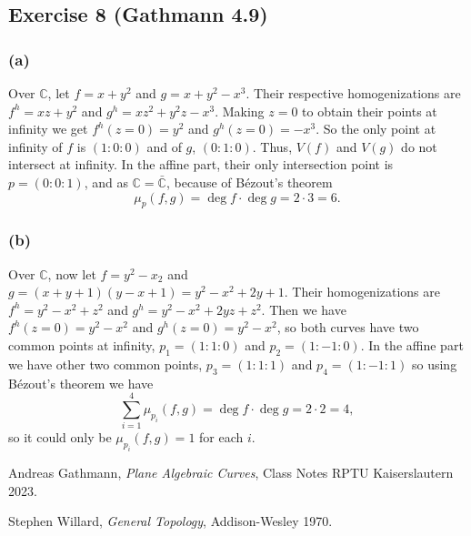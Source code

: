 \documentclass[11pt,a4paper]{article}
\begin{document}
\subsection*{Exercise 8 (Gathmann 4.9)}

\subsubsection*{(a)}
Over $ \mathbb C $, let $ f = x + y^2 $ and $ g = x + y^2 - x^3 $. Their respective homogenizations are $ f^{h} = xz +y^2 $ and $ g^{h} = xz^2 + y^2z - x^3 $. Making $ z = 0 $ to obtain their points at infinity we get $ f^{h}(z=0) = y^2 $ and $ g^{h}(z=0) = -x^3 $. So the only point at infinity of $ f $ is $ (1:0:0) $ and of $ g $, $ (0:1:0) $. Thus, $ V(f) $ and $ V(g) $ do not intersect at infinity. In the affine part, their only intersection point is $ p = (0:0:1) $, and as $ \mathbb C = \bar{\mathbb C}$, because of Bézout's theorem
$$
  \mu_p(f, g) = \deg f \cdot \deg g = 2 \cdot 3 = 6.
$$

\subsubsection*{(b)}
Over $ \mathbb C $, now let $ f = y^2 - x_2 $ and $ g = (x + y + 1) (y - x + 1) = y^2 - x^2 + 2y + 1 $. Their homogenizations are $ f^h = y^2 - x^2 + z^2 $ and $ g^h = y^2 - x^2 + 2yz + z^2 $. Then we have $ f^h(z=0) = y^2 - x^2 $ and $ g^h(z=0) = y^2 - x^2 $, so both curves have two common points at infinity, $ p_1 = (1:1:0) $ and $ p_2 = (1:-1:0) $. In the affine part we have other two common points, $ p_3 = (1:1:1) $ and $ p_4 = (1:-1:1) $ so using Bézout's theorem we have
$$
  \sum_{i=1}^{4} \mu_{p_i}(f, g) = \deg f \cdot \deg g = 2 \cdot 2 = 4,
$$
so it could only be $ \mu_{p_i}(f, g) = 1 $ for each $ i $.

\begin{thebibliography}{9}

  Andreas Gathmann,
  \textit{Plane Algebraic Curves},
  Class Notes RPTU Kaiserslautern 2023.

  Stephen Willard,
  \textit{General Topology},
  Addison-Wesley 1970.
  
\end{thebibliography}
\end{document}
